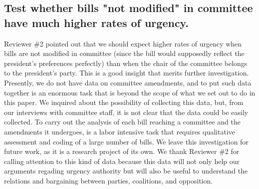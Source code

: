 \documentclass[article,letterpaper,times,12pt,listings-bw,microtype]{article}
\begin{document}
\subsection{Test whether bills "not modified" in committee have much higher rates of urgency.}
Reviewer \#2 pointed out that we should expect higher rates of urgency when bills are not modified in committee (since the bill would supposedly reflect the president's preferences perfectly) than when the chair of the committee belongs to the president's party. This is a good insight that merits further investigation. Presently, we do not have data on committee amendments, and to put such data together is an enormous task that is beyond the scope of what we set out to do in this paper. We inquired about the possibility of collecting this data, but, from our interviews with committee staff, it is not clear that the data could be easily collected. To carry out the analysis of each bill reaching a committee and the amendments it undergoes, is a labor intensive task that requires qualitative assessment and coding of a large number of bills. We leave this investigation for future work, as it is a research project of its own. We thank Reviewer \#2 for calling attention to this kind of data because this data will not only help our arguments regading urgency authority but will also be useful to understand the relations and bargaining between parties, coalitions, and opposition. 
 


\end{document}
